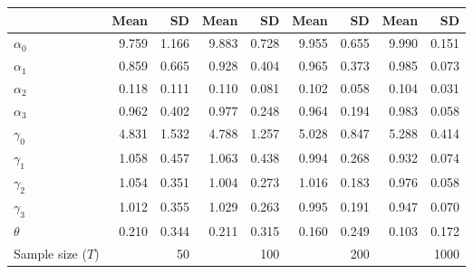 
\begin{tabular}[t]{lrrrrrrrr}
\toprule
  & Mean & SD & Mean  & SD  & Mean   & SD   & Mean    & SD   \\
\midrule
$\alpha_{0}$ & 9.759 & 1.166 & 9.883 & 0.728 & 9.955 & 0.655 & 9.990 & 0.151\\
$\alpha_{1}$ & 0.859 & 0.665 & 0.928 & 0.404 & 0.965 & 0.373 & 0.985 & 0.073\\
$\alpha_{2}$ & 0.118 & 0.111 & 0.110 & 0.081 & 0.102 & 0.058 & 0.104 & 0.031\\
$\alpha_{3}$ & 0.962 & 0.402 & 0.977 & 0.248 & 0.964 & 0.194 & 0.983 & 0.058\\
$\gamma_{0}$ & 4.831 & 1.532 & 4.788 & 1.257 & 5.028 & 0.847 & 5.288 & 0.414\\
$\gamma_{1}$ & 1.058 & 0.457 & 1.063 & 0.438 & 0.994 & 0.268 & 0.932 & 0.074\\
$\gamma_{2}$ & 1.054 & 0.351 & 1.004 & 0.273 & 1.016 & 0.183 & 0.976 & 0.058\\
$\gamma_{3}$ & 1.012 & 0.355 & 1.029 & 0.263 & 0.995 & 0.191 & 0.947 & 0.070\\
$\theta$ & 0.210 & 0.344 & 0.211 & 0.315 & 0.160 & 0.249 & 0.103 & 0.172\\
Sample size ($T$) &  & 50 &  & 100 &  & 200 &  & 1000\\
\bottomrule
\end{tabular}
